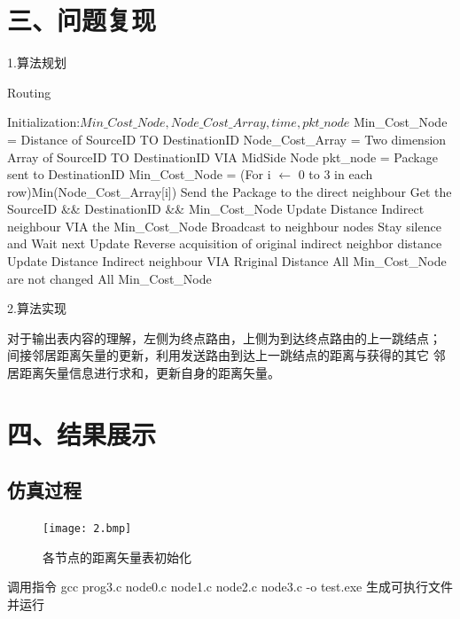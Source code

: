 \documentclass[UTF8,14pt]{article}
\numberwithin{figure}{section}
\begin{document}
\section{三、问题复现}
1.算法规划

\begin{minipage}{14cm}
    \begin{algorithm}[H]
        \renewcommand{\algorithmicrequire}{\textbf{Input:}}
        \renewcommand{\algorithmicensure}{\textbf{Output:}}
        \caption{Routing}
        \label{alg1}
        \begin{algorithmic}[1]
            \STATE Initialization:$Min\_Cost\_Node,Node\_Cost\_Array,time,pkt\_node$
            \STATE Min\_Cost\_Node = Distance of SourceID TO DestinationID
            \STATE Node\_Cost\_Array = Two dimension Array of SourceID TO DestinationID VIA MidSide Node
            \STATE pkt\_node = Package sent to DestinationID
            \STATE Min\_Cost\_Node = (For i $\leftarrow$ 0 to 3 in each row)Min(Node\_Cost\_Array[i])
            \STATE Send the Package to the direct neighbour
            \REPEAT
            \STATE Get the SourceID \&\& DestinationID \&\& Min\_Cost\_Node
            \STATE Update Distance Indirect neighbour VIA the Min\_Cost\_Node
            \STATE Broadcast to neighbour nodes
            \ELSE
            \STATE Stay silence and Wait next Update
            \ENDIF
            \STATE Reverse acquisition of original indirect neighbor distance
            \STATE Update Distance Indirect neighbour VIA Rriginal Distance
            \ENDIF
            \UNTIL All  Min\_Cost\_Node are not changed
            \ENSURE  All  Min\_Cost\_Node
        \end{algorithmic}
    \end{algorithm}
\end{minipage}
\vspace{0.7cm}

2.算法实现

对于输出表内容的理解，左侧为终点路由，上侧为到达终点路由的上一跳结点；
间接邻居距离矢量的更新，利用发送路由到达上一跳结点的距离与获得的其它
邻居距离矢量信息进行求和，更新自身的距离矢量。
\newpage
\section{四、结果展示}
\subsection{仿真过程}
\begin{figure}[ht]
    \centering
    \texttt{[image: 2.bmp]}
    \caption{各节点的距离矢量表初始化}
\end{figure}
调用指令 gcc prog3.c node0.c node1.c node2.c node3.c -o test.exe 生成可执行文件并运行
\end{document}
